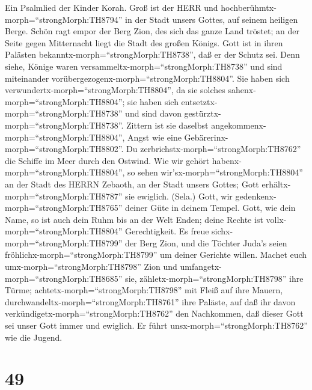  Ein Psalmlied der Kinder Korah. Groß ist der HERR und
hochberühmtx-morph=``strongMorph:TH8794'' in der Stadt unsers Gottes,
auf seinem heiligen Berge.  Schön ragt empor der Berg Zion,
des sich das ganze Land tröstet; an der Seite gegen Mitternacht liegt
die Stadt des großen Königs.  Gott ist in ihren Palästen
bekanntx-morph=``strongMorph:TH8738'', daß er der Schutz sei.
 Denn siehe, Könige waren
versammeltx-morph=``strongMorph:TH8738'' und sind miteinander
vorübergezogenx-morph=``strongMorph:TH8804''.  Sie haben
sich verwundertx-morph=``strongMorph:TH8804'', da sie solches
sahenx-morph=``strongMorph:TH8804''; sie haben sich
entsetztx-morph=``strongMorph:TH8738'' und sind davon
gestürztx-morph=``strongMorph:TH8738''.  Zittern ist sie
daselbst angekommenx-morph=``strongMorph:TH8804'', Angst wie eine
Gebärerinx-morph=``strongMorph:TH8802''.  Du
zerbrichstx-morph=``strongMorph:TH8762'' die Schiffe im Meer durch den
Ostwind.  Wie wir gehört
habenx-morph=``strongMorph:TH8804'', so sehen
wir'sx-morph=``strongMorph:TH8804'' an der Stadt des HERRN Zebaoth, an
der Stadt unsers Gottes; Gott erhältx-morph=``strongMorph:TH8787'' sie
ewiglich. (Sela.)  Gott, wir
gedenkenx-morph=``strongMorph:TH8765'' deiner Güte in deinem Tempel.
 Gott, wie dein Name, so ist auch dein Ruhm bis an der Welt
Enden; deine Rechte ist vollx-morph=``strongMorph:TH8804''
Gerechtigkeit.  Es freue sichx-morph=``strongMorph:TH8799''
der Berg Zion, und die Töchter Juda's seien
fröhlichx-morph=``strongMorph:TH8799'' um deiner Gerichte willen.
 Machet euch umx-morph=``strongMorph:TH8798'' Zion und
umfangetx-morph=``strongMorph:TH8685'' sie,
zähletx-morph=``strongMorph:TH8798'' ihre Türme; 
achtetx-morph=``strongMorph:TH8798'' mit Fleiß auf ihre Mauern,
durchwandeltx-morph=``strongMorph:TH8761'' ihre Paläste, auf daß ihr
davon verkündigetx-morph=``strongMorph:TH8762'' den Nachkommen,
 daß dieser Gott sei unser Gott immer und ewiglich. Er
führt unsx-morph=``strongMorph:TH8762'' wie die Jugend.

\hypertarget{section-48}{%
\section{49}\label{section-48}}

